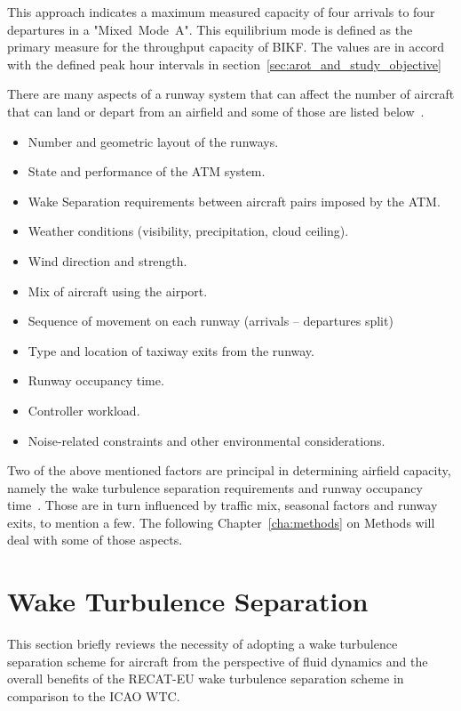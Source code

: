 This approach indicates a maximum measured capacity of four arrivals to four departures in a "Mixed~Mode~A". This equilibrium mode is defined as the primary measure for the throughput capacity of BIKF. The values are in accord with the defined peak hour intervals in section~\ref{sec:arot_and_study_objective}

There are many aspects of a runway system that can affect the number of aircraft that can land or depart from an airfield and some of those are listed below~\cite{de_neufville_airport_2013, kim_validation_2010}.
\begin{itemize}
    \item Number and geometric layout of the runways.
    \item State and performance of the ATM system.
    \item Wake Separation requirements between aircraft pairs imposed by the ATM.
    \item Weather conditions (visibility, precipitation, cloud ceiling). 
    \item Wind direction and strength.
    \item Mix of aircraft using the airport.
    \item Sequence of movement on each runway (arrivals -- departures split)
    \item Type and location of taxiway exits from the runway.
    \item Runway occupancy time.
    \item Controller workload.
    \item Noise-related constraints and other environmental considerations.
\end{itemize}

Two of the above mentioned factors are principal in determining airfield capacity, namely the wake turbulence separation requirements and runway occupancy time~\cite{kolos2013influence}. Those are in turn influenced by traffic mix, seasonal factors and runway exits, to mention a few. The following Chapter~\ref{cha:methods} on Methods will deal with some of those aspects. 


\section{Wake Turbulence Separation}
This section briefly reviews the necessity of adopting a wake turbulence separation scheme for aircraft from the perspective of fluid dynamics and the overall benefits of the RECAT-EU wake turbulence separation scheme in comparison to the ICAO WTC.


